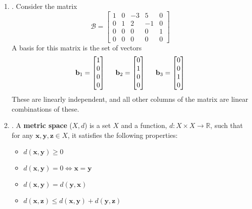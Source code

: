 \documentclass[12pt]{article}
\begin{document}
\begin{enumerate}
\begin{enumerate}
	\item\underline{}.
		Consider the matrix
			\[\mathcal{B}=\begin{bmatrix}1 & 0 & -3 & 5 & 0 \\ 0 & 1 & 2 & -1 & 0 \\ 0 & 0 & 0 & 0 & 1 \\ 0 & 0 & 0 & 0 & 0\end{bmatrix}\]
		A basis for this matrix is the set of vectors
			\[\mathbf{b}_1=\begin{bmatrix}1\\0\\0\\0\end{bmatrix}\hspace{5mm}\mathbf{b}_2=\begin{bmatrix}0\\1\\0\\0\end{bmatrix}
				\hspace{5mm}\mathbf{b}_3=\begin{bmatrix}0\\0\\1\\0\end{bmatrix}\]
		These are linearly independent, and all other columns of the matrix are linear combinations of these.




	\item\underline{}.
		A \textbf{metric space} ($X, d$) is a set $X$ and a function, $d:X\times X\rightarrow\mathbb{R}$, such that for any $\mathbf{x},\mathbf{y},\mathbf{z}\in X$, it satisfies
		the following properties:
		\begin{itemize}
		\item $d(\mathbf{x},\mathbf{y})\geq 0$
		\item $d(\mathbf{x},\mathbf{y})=0\iff \mathbf{x}=\mathbf{y}$
		\item $d(\mathbf{x},\mathbf{y})=d(\mathbf{y},\mathbf{x})$
		\item $d(\mathbf{x},\mathbf{z})\leq d(\mathbf{x},\mathbf{y})+d(\mathbf{y},\mathbf{z})$
		\end{itemize}


\end{enumerate}
\end{enumerate}
\end{document}
